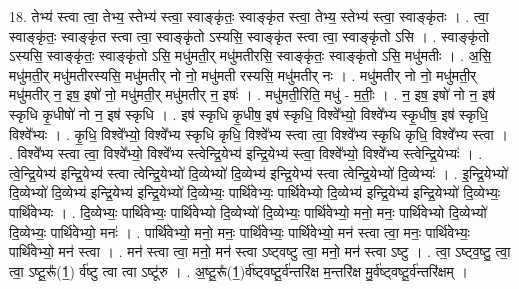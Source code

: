 \documentclass[17pt]{extarticle}
\begin{document}
18. तेभ्य॑ स्त्वा त्वा॒ तेभ्य॒ स्तेभ्य॑ स्त्वा॒ स्वाङ्कृ॑तः॒ स्वाङ्कृ॑त स्त्वा॒ तेभ्य॒ स्तेभ्य॑ स्त्वा॒ स्वाङ्कृ॑तः । . त्वा॒ स्वाङ्कृ॑तः॒ स्वाङ्कृ॑त स्त्वा त्वा॒ स्वाङ्कृ॑तो ऽस्यसि॒ स्वाङ्कृ॑त स्त्वा त्वा॒ स्वाङ्कृ॑तो ऽसि । . स्वाङ्कृ॑तो ऽस्यसि॒ स्वाङ्कृ॑तः॒ स्वाङ्कृ॑तो ऽसि॒ मधु॑मती॒र् मधु॑मतीरसि॒ स्वाङ्कृ॑तः॒ स्वाङ्कृ॑तो ऽसि॒ मधु॑मतीः । . अ॒सि॒ मधु॑मती॒र् मधु॑मतीरस्यसि॒ मधु॑मतीर् नो नो॒ मधु॑मती रस्यसि॒ मधु॑मतीर् नः । . मधु॑मतीर् नो नो॒ मधु॑मती॒र् मधु॑मतीर् न॒ इष॒ इषो॑ नो॒ मधु॑मती॒र् मधु॑मतीर् न॒ इषः॑ । . मधु॑मती॒रिति॒ मधु॑ - म॒तीः॒ । . न॒ इष॒ इषो॑ नो न॒ इष॑ स्कृधि कृ॒धीषो॑ नो न॒ इष॑ स्कृधि । . इष॑ स्कृधि कृ॒धीष॒ इष॑ स्कृधि॒ विश्वे᳚भ्यो॒ विश्वे᳚भ्य स्कृ॒धीष॒ इष॑ स्कृधि॒ विश्वे᳚भ्यः । . कृ॒धि॒ विश्वे᳚भ्यो॒ विश्वे᳚भ्य स्कृधि कृधि॒ विश्वे᳚भ्य स्त्वा त्वा॒ विश्वे᳚भ्य स्कृधि कृधि॒ विश्वे᳚भ्य स्त्वा । . विश्वे᳚भ्य स्त्वा त्वा॒ विश्वे᳚भ्यो॒ विश्वे᳚भ्य स्त्वेन्द्रि॒येभ्य॑ इन्द्रि॒येभ्य॑ स्त्वा॒ विश्वे᳚भ्यो॒ विश्वे᳚भ्य स्त्वेन्द्रि॒येभ्यः॑ । . त्वे॒न्द्रि॒येभ्य॑ इन्द्रि॒येभ्य॑ स्त्वा त्वेन्द्रि॒येभ्यो॑ दि॒व्येभ्यो॑ दि॒व्येभ्य॑ इन्द्रि॒येभ्य॑ स्त्वा त्वेन्द्रि॒येभ्यो॑ दि॒व्येभ्यः॑ । . इ॒न्द्रि॒येभ्यो॑ दि॒व्येभ्यो॑ दि॒व्येभ्य॑ इन्द्रि॒येभ्य॑ इन्द्रि॒येभ्यो॑ दि॒व्येभ्यः॒ पार्थि॑वेभ्यः॒ पार्थि॑वेभ्यो दि॒व्येभ्य॑ इन्द्रि॒येभ्य॑ इन्द्रि॒येभ्यो॑ दि॒व्येभ्यः॒ पार्थि॑वेभ्यः । . दि॒व्येभ्यः॒ पार्थि॑वेभ्यः॒ पार्थि॑वेभ्यो दि॒व्येभ्यो॑ दि॒व्येभ्यः॒ पार्थि॑वेभ्यो॒ मनो॒ मनः॒ पार्थि॑वेभ्यो दि॒व्येभ्यो॑ दि॒व्येभ्यः॒ पार्थि॑वेभ्यो॒ मनः॑ । . पार्थि॑वेभ्यो॒ मनो॒ मनः॒ पार्थि॑वेभ्यः॒ पार्थि॑वेभ्यो॒ मन॑ स्त्वा त्वा॒ मनः॒ पार्थि॑वेभ्यः॒ पार्थि॑वेभ्यो॒ मन॑ स्त्वा । . मन॑ स्त्वा त्वा॒ मनो॒ मन॑ स्त्वा ऽष्ट्वष्टु त्वा॒ मनो॒ मन॑ स्त्वा ऽष्टु । . त्वा॒ ऽष्ट्व॒ष्टु॒ त्वा॒ त्वा॒ ऽष्टू॒रू᳚(1॒) र्व॑ष्टु त्वा त्वा ऽष्टू॑रु । . अ॒ष्टू॒रू᳚(1॒)र्व॑ष्ट्वष्टू॒र्व॑न्तरि॑क्ष म॒न्तरि॑क्ष मु॒र्व॑ष्ट्वष्टू॒र्व॑न्तरि॑क्षम् । \newline
\end{document}
